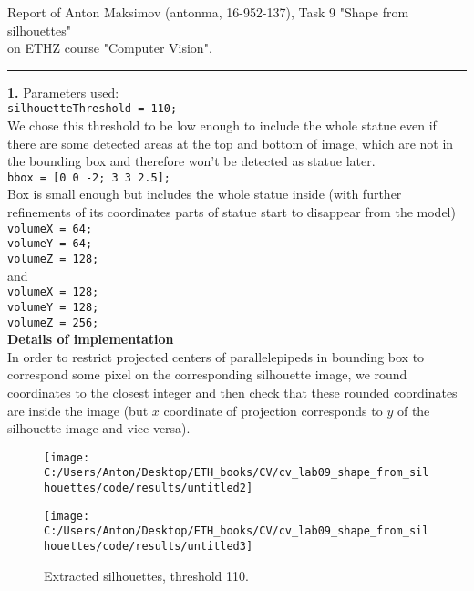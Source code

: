\documentclass{report}
\begin{document}
\large
Report of Anton Maksimov (antonma, 16-952-137), Task 9 "Shape from silhouettes"\\
 on ETHZ course "Computer Vision".\\
\rule{\linewidth}{1pt}
	\textbf{1.} Parameters used:\\
	
	\texttt{silhouetteThreshold = 110;}\\
	We chose this threshold to be low enough to include the whole statue even if there are some detected areas at the top and bottom of image, which are not in the bounding box and therefore won't be detected as statue later.\\
	
	\texttt{bbox = [0 0 -2; 3 3 2.5];}\\
	Box is small enough but includes the whole statue inside (with further refinements of its coordinates parts of statue start to disappear from the model)\\
	
	\texttt{volumeX = 64;}\\
	\texttt{volumeY = 64;}\\
	\texttt{volumeZ = 128;}\\ 
	and\\
	\texttt{volumeX = 128;}\\
	\texttt{volumeY = 128;}\\
	\texttt{volumeZ = 256;}\\ 
	
	\textbf{Details of implementation}\\
	In order to restrict projected centers of parallelepipeds in bounding box to correspond some pixel on the corresponding silhouette image, we round coordinates to the closest integer and then check that these rounded coordinates are inside the image (but $x$ coordinate of projection corresponds to $y$ of the silhouette image and vice versa).
	
	
	
		\begin{figure}[h]
		\begin{center}
			\label{tang1}
			\begin{minipage}[h]{0.95\linewidth}
				\texttt{[image: C:/Users/Anton/Desktop/ETH\_books/CV/cv\_lab09\_shape\_from\_silhouettes/code/results/untitled2]}
			\end{minipage}
			\vfill
			\begin{minipage}[h]{0.95\linewidth}
				\texttt{[image: C:/Users/Anton/Desktop/ETH\_books/CV/cv\_lab09\_shape\_from\_silhouettes/code/results/untitled3]}
			\end{minipage}
			
			\caption{Extracted silhouettes, threshold 110.}
		\end{center}
	\end{figure}
\end{document}
